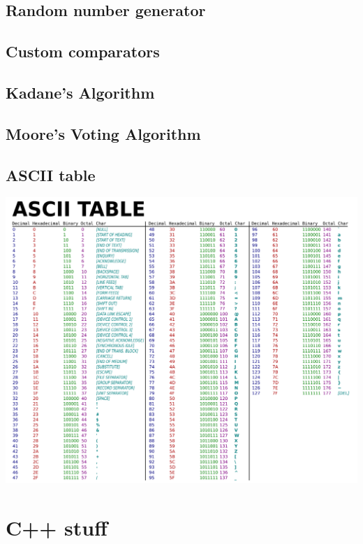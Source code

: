 \documentclass[10pt]{article}
\begin{document}
\begin{multicols*}{2}
\subsection{Random number generator}


\subsection{Custom comparators}


\subsection{Kadane's Algorithm}


\subsection{Moore's Voting Algorithm}


\subsection{ASCII table}
\includegraphics[width=0.8\linewidth]{img/ASCII-Table.png}


\section{C++ stuff}


\end{multicols*}
\end{document}
